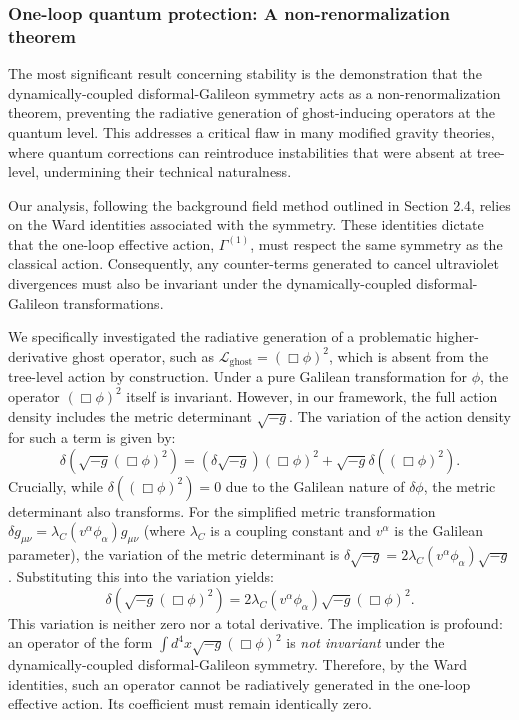 \documentclass[twocolumn]{aastex631}
\begin{document}
\subsubsection{One-loop quantum protection: A non-renormalization theorem}
The most significant result concerning stability is the demonstration that the dynamically-coupled disformal-Galileon symmetry acts as a non-renormalization theorem, preventing the radiative generation of ghost-inducing operators at the quantum level. This addresses a critical flaw in many modified gravity theories, where quantum corrections can reintroduce instabilities that were absent at tree-level, undermining their technical naturalness.

Our analysis, following the background field method outlined in Section 2.4, relies on the Ward identities associated with the symmetry. These identities dictate that the one-loop effective action, $\Gamma^{(1)}$, must respect the same symmetry as the classical action. Consequently, any counter-terms generated to cancel ultraviolet divergences must also be invariant under the dynamically-coupled disformal-Galileon transformations.

We specifically investigated the radiative generation of a problematic higher-derivative ghost operator, such as $\mathcal{L}_{\text{ghost}} = (\Box \phi)^2$, which is absent from the tree-level action by construction. Under a pure Galilean transformation for $\phi$, the operator $(\Box \phi)^2$ itself is invariant. However, in our framework, the full action density includes the metric determinant $\sqrt{-g}$. The variation of the action density for such a term is given by:
\begin{equation}
\delta \left( \sqrt{-g} (\Box \phi)^2 \right) = \left( \delta \sqrt{-g} \right) (\Box \phi)^2 + \sqrt{-g} \delta \left( (\Box \phi)^2 \right).
\end{equation}
Crucially, while $\delta \left( (\Box \phi)^2 \right) = 0$ due to the Galilean nature of $\delta \phi$, the metric determinant also transforms. For the simplified metric transformation $\delta g_{\mu\nu} = \lambda_C (v^\alpha \phi_\alpha) g_{\mu\nu}$ (where $\lambda_C$ is a coupling constant and $v^\alpha$ is the Galilean parameter), the variation of the metric determinant is $\delta \sqrt{-g} = 2 \lambda_C (v^\alpha \phi_\alpha) \sqrt{-g}$. Substituting this into the variation yields:
\begin{equation}
\delta \left( \sqrt{-g} (\Box \phi)^2 \right) = 2 \lambda_C (v^\alpha \phi_\alpha) \sqrt{-g} (\Box \phi)^2.
\end{equation}
This variation is neither zero nor a total derivative. The implication is profound: an operator of the form $\int d^4x \sqrt{-g} (\Box \phi)^2$ is \textit{not invariant} under the dynamically-coupled disformal-Galileon symmetry. Therefore, by the Ward identities, such an operator cannot be radiatively generated in the one-loop effective action. Its coefficient must remain identically zero.
\end{document}

